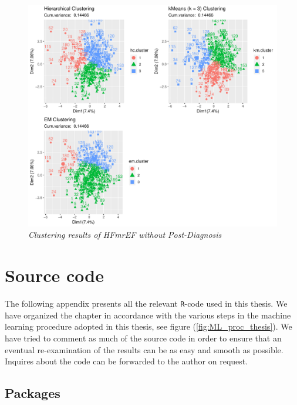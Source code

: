 \documentclass[../thesis.tex]{subfiles}
\begin{document}
\newpage

\begin{figure}[h!]
    \centering
    \hspace*{-1cm}\includegraphics[width=1.1\textwidth]{doc/thesis/images/ClustmrNoPhy.pdf}
    \caption[HFmrEF without Post-Diagnosis]{\textit{Clustering results of HFmrEF \textit{without} Post-Diagnosis}}
    \label{fig:clust_results_without_post_mr}
\end{figure}

\chapter{Source code}
\label{chap:souce_code}

\noindent The following appendix presents all the relevant \texttt{R}-code used in this thesis. We have organized the chapter in accordance with the various steps in the machine learning procedure adopted in this thesis, see figure (\ref{fig:ML_proc_thesis}). We have tried to comment as much of the source code in order to ensure that an eventual re-examination of the results can be as easy and smooth as possible. Inquires about the code can be forwarded to the author on request.

\section{Packages}
\label{sec:pack_code}
\end{document}
